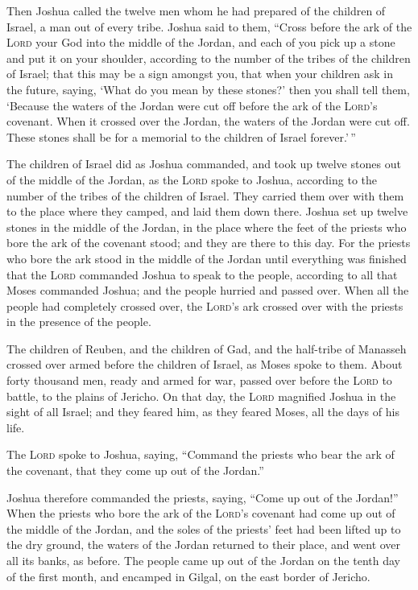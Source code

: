  Then Joshua called the twelve men whom he had prepared of
the children of Israel, a man out of every tribe.  Joshua
said to them, ``Cross before the ark of the \textsc{Lord} your God into
the middle of the Jordan, and each of you pick up a stone and put it on
your shoulder, according to the number of the tribes of the children of
Israel;  that this may be a sign amongst you, that when
your children ask in the future, saying, `What do you mean by these
stones?'  then you shall tell them, `Because the waters of
the Jordan were cut off before the ark of the \textsc{Lord}'s covenant.
When it crossed over the Jordan, the waters of the Jordan were cut off.
These stones shall be for a memorial to the children of Israel
forever.'\,''

 The children of Israel did as Joshua commanded, and took
up twelve stones out of the middle of the Jordan, as the \textsc{Lord}
spoke to Joshua, according to the number of the tribes of the children
of Israel. They carried them over with them to the place where they
camped, and laid them down there.  Joshua set up twelve
stones in the middle of the Jordan, in the place where the feet of the
priests who bore the ark of the covenant stood; and they are there to
this day.  For the priests who bore the ark stood in the
middle of the Jordan until everything was finished that the
\textsc{Lord} commanded Joshua to speak to the people, according to all
that Moses commanded Joshua; and the people hurried and passed over.
 When all the people had completely crossed over, the
\textsc{Lord}'s ark crossed over with the priests in the presence of the
people.

 The children of Reuben, and the children of Gad, and the
half-tribe of Manasseh crossed over armed before the children of Israel,
as Moses spoke to them.  About forty thousand men, ready
and armed for war, passed over before the \textsc{Lord} to battle, to
the plains of Jericho.  On that day, the \textsc{Lord}
magnified Joshua in the sight of all Israel; and they feared him, as
they feared Moses, all the days of his life.

 The \textsc{Lord} spoke to Joshua, saying,
 ``Command the priests who bear the ark of the covenant,
that they come up out of the Jordan.''

 Joshua therefore commanded the priests, saying, ``Come
up out of the Jordan!''  When the priests who bore the
ark of the \textsc{Lord}'s covenant had come up out of the middle of the
Jordan, and the soles of the priests' feet had been lifted up to the dry
ground, the waters of the Jordan returned to their place, and went over
all its banks, as before.  The people came up out of the
Jordan on the tenth day of the first month, and encamped in Gilgal, on
the east border of Jericho.

